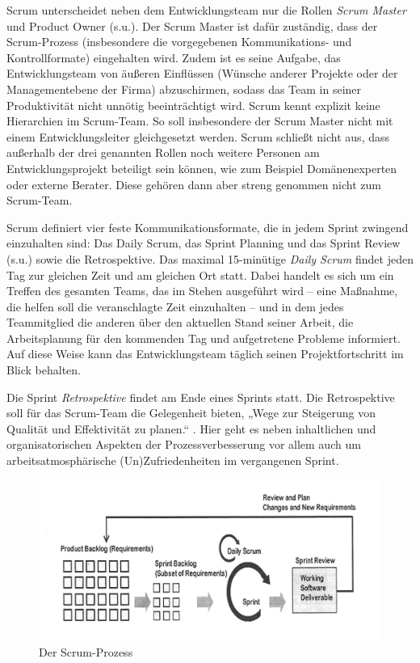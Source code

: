 Scrum unterscheidet neben dem Entwicklungsteam nur die Rollen 
\textit{Scrum Master} und Product Owner (s.u.). Der Scrum Master ist dafür zuständig, dass der Scrum-Prozess (insbesondere die vorgegebenen Kommunikations- und Kontrollformate) eingehalten wird. Zudem ist es seine Aufgabe, das Entwicklungsteam von äußeren Einflüssen (\zb Wünsche anderer Projekte oder der Managementebene der Firma) \mbox{abzuschirmen}, sodass das Team in seiner Produktivität nicht unnötig beeinträchtigt wird. Scrum kennt explizit keine Hierarchien im Scrum-Team. So soll insbesondere der Scrum Master nicht mit einem Entwicklungsleiter gleichgesetzt werden. Scrum schließt nicht aus, dass außerhalb der drei genannten Rollen noch weitere Personen am Entwicklungsprojekt beteiligt sein können, wie zum Beispiel Domänenexperten oder externe Berater. Diese gehören dann aber streng genommen nicht zum Scrum-Team.

Scrum  definiert vier feste Kommunikationsformate, die in jedem Sprint zwingend einzuhalten sind: Das Daily Scrum, das Sprint Planning und das Sprint Review (s.u.) sowie die Retrospektive. Das maximal 15-minütige \textit{Daily Scrum}  
findet jeden Tag zur gleichen Zeit und am gleichen Ort statt. Dabei handelt es sich um ein Treffen des gesamten Teams, das im Stehen ausgeführt wird – eine Maßnahme, die helfen soll die veranschlagte Zeit einzuhalten – und in dem jedes Teammitglied die anderen über den aktuellen Stand seiner Arbeit, die Arbeitsplanung für den kommenden Tag und aufgetretene Probleme informiert. Auf diese Weise kann das Entwicklungsteam täglich seinen Projektfortschritt im Blick behalten.

Die Sprint \textit{Retrospektive} 
findet am Ende eines Sprints statt. Die Retrospektive soll für das Scrum-Team die Gelegenheit bieten, „Wege zur Steigerung von Qualität und Effektivität zu planen.“ \cite[10]{sch20}. Hier geht es neben inhaltlichen und organisatorischen Aspekten der Prozessverbesserung vor allem auch um arbeitsatmosphärische (Un)Zufriedenheiten im vergangenen Sprint.

\vspace{-\baselineskip} %

\begin{figure}[h!]
	\centering
	\includegraphics[scale=0.7]{Bilder/Kapitel-2/ScrumProzess.png}
	\caption[Der Scrum-Prozess]{Der Scrum-Prozess \cite[7312]{gut15}}
	\label{fig:scrum_prozess}
\end{figure}

